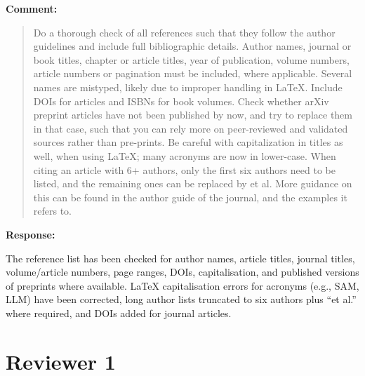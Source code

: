 \documentclass[11pt,a4paper]{article}
\newenvironment{commentblock}{%
  \par\smallskip\noindent\textbf{Comment:}\par
  \begin{quote}\itshape\color{black}
}{%
  \end{quote}\smallskip
}
\newenvironment{responseblock}{%
  \par\smallskip\noindent\textbf{Response:}\par
  \begingroup\color{responsegreen}
}{%
  \endgroup\smallskip
}
\begin{document}
\begin{commentblock}
Do a thorough check of all references such that they follow the author guidelines and include full bibliographic details. Author names, journal or book titles, chapter or article titles, year of publication, volume numbers, article numbers or pagination must be included, where applicable. Several names are mistyped, likely due to improper handling in \LaTeX. Include DOIs for articles and ISBNs for book volumes. Check whether arXiv preprint articles have not been published by now, and try to replace them in that case, such that you can rely more on peer-reviewed and validated sources rather than pre-prints. Be careful with capitalization in titles as well, when using \LaTeX; many acronyms are now in lower-case. When citing an article with 6+ authors, only the first six authors need to be listed, and the remaining ones can be replaced by et al. More guidance on this can be found in the author guide of the journal, and the examples it refers to.
\end{commentblock}
\begin{responseblock}
The reference list has been checked for author names, article titles, journal titles, volume/article numbers, page ranges, DOIs, capitalisation, and published versions of preprints where available. \LaTeX{} capitalisation errors for acronyms (e.g., SAM, LLM) have been corrected, long author lists truncated to six authors plus ``et al.'' where required, and DOIs added for journal articles.
\end{responseblock}

\section*{Reviewer 1}
\end{document}
